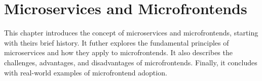 \chapter{Microservices and Microfrontends}
\label{chap:MicroservicesAndMicrofrontends} 
This chapter introduces the concept of microservices and microfrontends, starting with theirs brief history. It futher explores the fundamental principles of microservices and how they apply to microfrontends. It also describes the challenges, advantages, and disadvantages of microfrontends. Finally, it concludes with real-world examples of microfrontend adoption.






